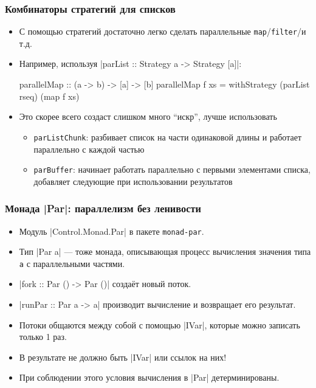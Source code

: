 \documentclass[11pt]{beamer}
\begin{document}
\begin{frame}[fragile]
  \frametitle{Комбинаторы стратегий для списков}
  \begin{itemize}
    \item С помощью стратегий достаточно легко сделать параллельные \lstinline|map|/\lstinline|filter|/и т.д.
    \item Например, используя \haskinline|parList :: Strategy a -> Strategy [a]|:
          \begin{haskell}
parallelMap :: (a -> b) -> [a] -> [b]
parallelMap f xs = 
  withStrategy (parList rseq) (map f xs)
\end{haskell}
          \pause
    \item Это скорее всего создаст слишком много \enquote{искр}, лучше использовать
          \begin{itemize}
            \item \lstinline|parListChunk|: разбивает список на части одинаковой длины и работает параллельно с каждой частью
            \item \lstinline|parBuffer|: начинает работать параллельно с первыми элементами списка, добавляет следующие при использовании результатов
          \end{itemize}
  \end{itemize}
\end{frame}

\begin{frame}[fragile]
  \frametitle{Монада \haskinline|Par|: параллелизм без ленивости}
  \begin{itemize}
    \item Модуль \haskinline|Control.Monad.Par| в пакете \lstinline|monad-par|.
    \item Тип \haskinline|Par a| --- тоже монада, описывающая процесс вычисления значения типа \lstinline|a| с параллельными частями.
    \item \haskinline|fork :: Par () -> Par ()| создаёт новый поток.
    \item \haskinline|runPar :: Par a -> a| производит вычисление и возвращает его результат. \pause
    \item Потоки общаются между собой с помощью \haskinline|IVar|, которые можно записать только 1 раз.
    \item В результате не должно быть \haskinline|IVar| или ссылок на них!
    \item При соблюдении этого условия вычисления в \haskinline|Par| детерминированы.
  \end{itemize}
\end{frame}
\end{document}
